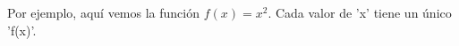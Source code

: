 \documentclass[preview]{standalone}
\begin{document}
\begin{center}
Por ejemplo, aquí vemos la función $f(x) = x^2$. Cada valor de 'x' tiene un único 'f(x)'.
\end{center}
\end{document}

